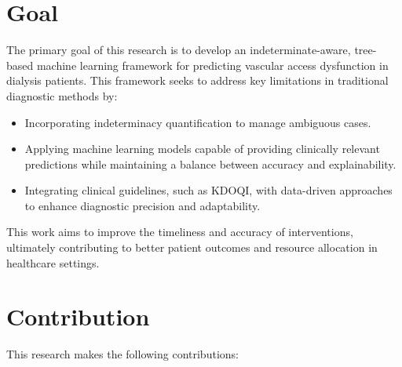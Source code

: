 \section{Goal}

The primary goal of this research is to develop an indeterminate-aware, tree-based machine learning framework for predicting vascular access dysfunction in dialysis patients. This framework seeks to address key limitations in traditional diagnostic methods by:

\begin{itemize}
    \item Incorporating indeterminacy quantification to manage ambiguous cases.
    \item Applying machine learning models capable of providing clinically relevant predictions while maintaining a balance between accuracy and explainability.
    \item Integrating clinical guidelines, such as KDOQI, with data-driven approaches to enhance diagnostic precision and adaptability.
\end{itemize}

This work aims to improve the timeliness and accuracy of interventions, ultimately contributing to better patient outcomes and resource allocation in healthcare settings.
\newpage
\section{Contribution}

This research makes the following contributions:

